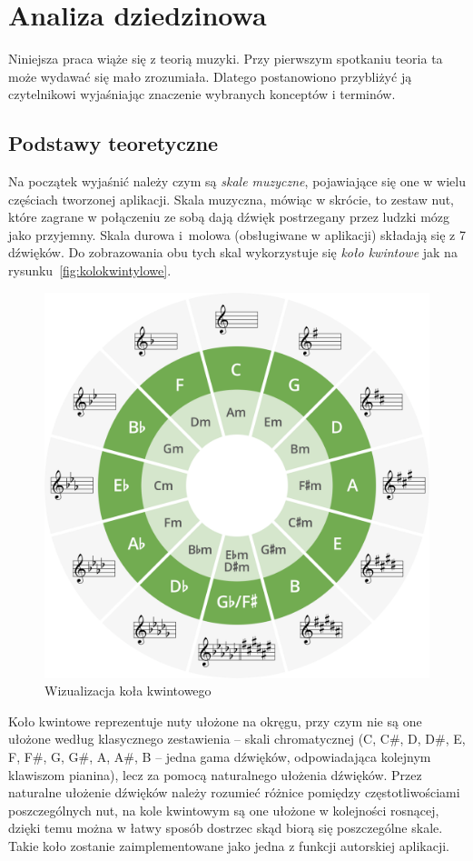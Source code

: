 \chapter{Analiza dziedzinowa}
Niniejsza praca wiąże się z teorią muzyki. Przy pierwszym spotkaniu teoria ta może wydawać się mało zrozumiała. Dlatego postanowiono przybliżyć ją czytelnikowi wyjaśniając znaczenie wybranych konceptów i terminów.
\section{Podstawy teoretyczne}
Na początek wyjaśnić należy czym są \emph{skale muzyczne}, pojawiające się one w wielu częściach tworzonej aplikacji. Skala muzyczna, mówiąc w skrócie, to zestaw nut, które zagrane w połączeniu ze sobą dają dźwięk postrzegany przez ludzki mózg jako przyjemny. Skala durowa i~molowa (obsługiwane w aplikacji) składają się z 7 dźwięków. Do zobrazowania obu tych skal wykorzystuje się \emph{koło kwintowe} jak na rysunku~\ref{fig:kolokwintylowe}. 
\begin{figure}[htb]
	\centering
	\includegraphics[width=.48\linewidth]{rys02/cof2.1}
	\caption{Wizualizacja koła kwintowego} \label{fig:kolokwintowe}
\end{figure}

Koło kwintowe reprezentuje nuty ułożone na okręgu, przy czym nie są one ułożone według klasycznego zestawienia -- skali chromatycznej (C, C\#, D, D\#, E, F, F\#, G, G\#, A, A\#, B -- jedna gama dźwięków, odpowiadająca kolejnym klawiszom pianina), lecz za pomocą naturalnego ułożenia dźwięków. 
Przez naturalne ułożenie dźwięków należy rozumieć różnice pomiędzy częstotliwościami poszczególnych nut, na kole kwintowym są one ułożone w kolejności rosnącej, dzięki temu można w łatwy sposób dostrzec skąd biorą się poszczególne skale. Takie koło zostanie zaimplementowane jako jedna z funkcji autorskiej aplikacji.


